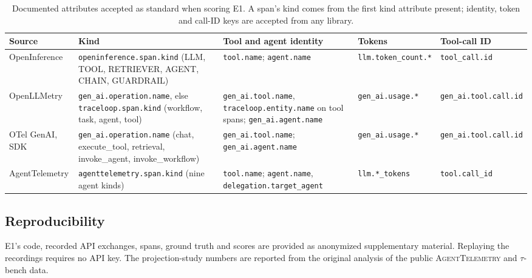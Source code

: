 \documentclass[conference]{IEEEtran}
\begin{document}
\begin{table}[t]
\centering
\scriptsize
\caption{Documented attributes accepted as standard when scoring E1. A
span's kind comes from the first kind attribute present; identity,
token and call-ID keys are accepted from any library.}
\label{tab:mapping}
\setlength{\tabcolsep}{4pt}
\begin{tabular}{@{}>{\raggedright\arraybackslash}p{}>{\raggedright\arraybackslash}p{}>{\raggedright\arraybackslash}p{}>{\raggedright\arraybackslash}p{}>{\raggedright\arraybackslash}p{}@{}}
\toprule
Source & Kind & Tool and agent identity & Tokens & Tool-call ID \\
\midrule
OpenInference & \texttt{openinference.span.kind} (LLM, TOOL, RETRIEVER, AGENT, CHAIN, GUARDRAIL) & \texttt{tool.name}; \texttt{agent.name} & \texttt{llm.token\_count.*} & \texttt{tool\_call.id} \\
OpenLLMetry & \texttt{gen\_ai.operation.name}, else \texttt{traceloop.span.kind} (workflow, task, agent, tool) & \texttt{gen\_ai.tool.name}, \texttt{traceloop.entity.name} on tool spans; \texttt{gen\_ai.agent.name} & \texttt{gen\_ai.usage.*} & \texttt{gen\_ai.tool.call.id} \\
OTel GenAI, SDK & \texttt{gen\_ai.operation.name} (chat, execute\_tool, retrieval, invoke\_agent, invoke\_workflow) & \texttt{gen\_ai.tool.name}; \texttt{gen\_ai.agent.name} & \texttt{gen\_ai.usage.*} & \texttt{gen\_ai.tool.call.id} \\
AgentTelemetry & \texttt{agenttelemetry.span.kind} (nine agent kinds) & \texttt{tool.name}; \texttt{agent.name}, \texttt{delegation.target\_agent} & \texttt{llm.*\_tokens} & \texttt{tool.call\_id} \\
\bottomrule
\end{tabular}
\end{table}

\subsection{Reproducibility}

E1's code, recorded API exchanges, spans, ground truth and scores are
provided as anonymized supplementary material. Replaying the recordings
requires no API key. The projection-study numbers are reported from the
original analysis of the public \textsc{AgentTelemetry} and
$\tau$-bench data.

\end{document}
